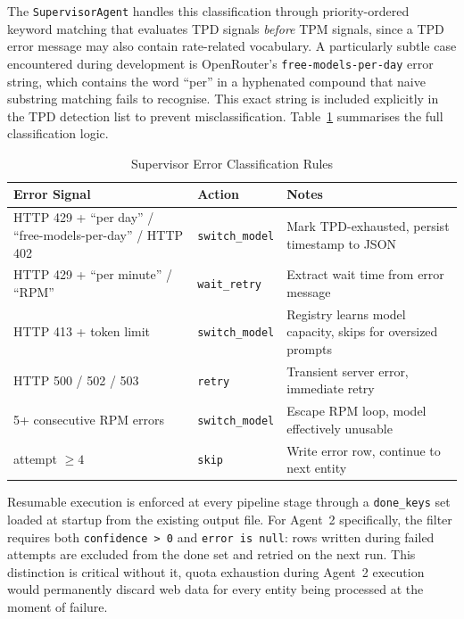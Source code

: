 The \texttt{SupervisorAgent} handles this classification through priority-ordered
keyword matching that evaluates TPD signals \textit{before} TPM signals, since a
TPD error message may also contain rate-related vocabulary. A particularly subtle
case encountered during development is OpenRouter's \texttt{free-models-per-day}
error string, which contains the word ``per'' in a hyphenated compound that naive
substring matching fails to recognise. This exact string is included explicitly in
the TPD detection list to prevent misclassification.
Table~\ref{tab:supervisor} summarises the full classification logic.

\begin{table}[H]
\centering
\caption{Supervisor Error Classification Rules}
\label{tab:supervisor}
\begin{tabular}{|p{4.5cm}|p{3.0cm}|p{5.5cm}|}
\hline
\textbf{Error Signal} & \textbf{Action} & \textbf{Notes} \\
\hline
HTTP 429 + ``per day'' / ``free-models-per-day'' / HTTP 402 & \texttt{switch\_model} & Mark TPD-exhausted, persist timestamp to JSON \\
\hline
HTTP 429 + ``per minute'' / ``RPM'' & \texttt{wait\_retry} & Extract wait time from error message \\
\hline
HTTP 413 + token limit & \texttt{switch\_model} & Registry learns model capacity, skips for oversized prompts \\
\hline
HTTP 500 / 502 / 503 & \texttt{retry} & Transient server error, immediate retry \\
\hline
5+ consecutive RPM errors & \texttt{switch\_model} & Escape RPM loop, model effectively unusable \\
\hline
attempt $\geq 4$ & \texttt{skip} & Write error row, continue to next entity \\
\hline
\end{tabular}
\end{table}

Resumable execution is enforced at every pipeline stage through a \texttt{done\_keys}
set loaded at startup from the existing output file. For Agent~2 specifically, the
filter requires both \texttt{confidence > 0} and \texttt{error is null}: rows written
during failed attempts are excluded from the done set and retried on the next run.
This distinction is critical without it, quota exhaustion during Agent~2 execution
would permanently discard web data for every entity being processed at the moment of
failure.

